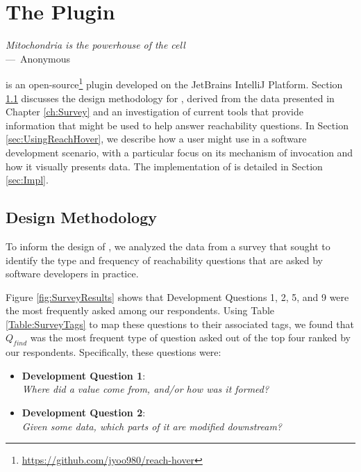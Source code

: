 
\chapter{The \toolname{} Plugin}
\label{ch:Tool}

\begin{epigraph}
  \emph{Mitochondria is the powerhouse of the cell}\\
     ---~Anonymous
\end{epigraph}

\noindent \toolname{} is an open-source\footnote{\url{https://github.com/jyoo980/reach-hover}}
plugin developed on the JetBrains IntelliJ Platform.
Section \ref{sec:DesignMeth} discusses the design methodology for \toolname{},
derived from the data presented in Chapter \ref{ch:Survey} and an investigation
of current tools that provide information that might be used to help answer
reachability questions.
In Section \ref{sec:UsingReachHover}, we describe how a user might use
\toolname{} in a software development scenario, with a particular focus on
its mechanism of invocation and how it visually presents data.
The implementation of \toolname{} is detailed in Section
\ref{sec:Impl}.

\section{Design Methodology}
\label{sec:DesignMeth}

\noindent To inform the design of \toolname{}, we analyzed the data from a 
survey that sought to identify the type and frequency of reachability questions 
that are asked by software developers in practice.

Figure \ref{fig:SurveyResults} shows that Development Questions 1, 2, 5, and 9
were the most frequently asked among our respondents.
Using Table \ref{Table:SurveyTags} to map these questions to their associated
tags, we found that $Q_{find}$ was the most frequent type of question asked out
of the top four ranked by our respondents.
Specifically, these questions were:

\begin{itemize}
  \item[] \textbf{Development Question 1}:\\ \textit{Where did a value come from,
  and/or how was it formed?}
  \item[] \textbf{Development Question 2}:\\ \textit{Given some data, which
  parts of it are modified downstream?}
\end{itemize}

